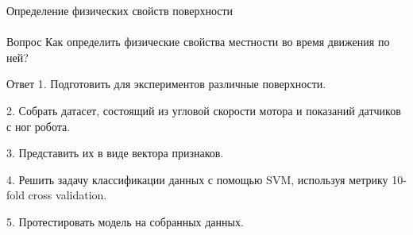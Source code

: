\documentclass[aspectratio=169,xcolor=table]{beamer}
\begin{document}
\begin{frame}[t]{Определение физических свойств поверхности}
    \framesubtitle{}
    \vspace{-0.3cm}
    {\large\begin{block}{Вопрос}
            Как определить физические свойства местности во время движения по ней?
        \end{block}}
    {\large\begin{alertblock}{Ответ}
            1. Подготовить для экспериментов различные поверхности.

            2. Собрать датасет, состоящий из угловой скорости мотора и показаний датчиков с ног робота.

            3. Представить их в виде вектора признаков.

            4. Решить задачу классификации данных с помощью SVM, используя метрику 10-fold cross validation.

            5. Протестировать модель на собранных данных.
        \end{alertblock}}
\end{frame}
\end{document}
